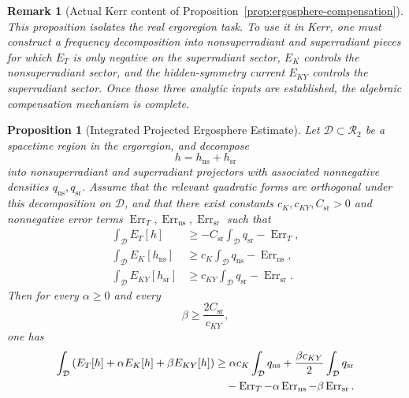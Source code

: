 \documentclass[12pt,a4paper]{article}
\newtheorem{proposition}[theorem]{Proposition}
\newtheorem{remark}[theorem]{Remark}
\begin{document}
\begin{remark}[Actual Kerr content of Proposition~\ref{prop:ergosphere-compensation}]
This proposition isolates the real ergoregion task. To use it in Kerr, one must construct a frequency decomposition into nonsuperradiant and superradiant pieces for which $E_T$ is only negative on the superradiant sector, $E_K$ controls the nonsuperradiant sector, and the hidden-symmetry current $E_{KY}$ controls the superradiant sector. Once those three analytic inputs are established, the algebraic compensation mechanism is complete.
\end{remark}

\begin{proposition}[Integrated Projected Ergosphere Estimate]\label{prop:integrated-ergosphere}
Let $\mathcal{D}\subset \mathcal{R}_2$ be a spacetime region in the ergoregion, and decompose
\begin{equation}
h = h_{\mathrm{ns}} + h_{\mathrm{sr}}
\end{equation}
into nonsuperradiant and superradiant projectors with associated nonnegative densities $q_{\mathrm{ns}}, q_{\mathrm{sr}}$. Assume that the relevant quadratic forms are orthogonal under this decomposition on $\mathcal{D}$, and that there exist constants $c_K,c_{KY},C_{\mathrm{sr}}>0$ and nonnegative error terms $\operatorname{Err}_T,\operatorname{Err}_{\mathrm{ns}},\operatorname{Err}_{\mathrm{sr}}$ such that
\begin{align}
\int_{\mathcal{D}} E_T[h] &\ge - C_{\mathrm{sr}} \int_{\mathcal{D}} q_{\mathrm{sr}} - \operatorname{Err}_T, \label{eq:int-erg-1}\\
\int_{\mathcal{D}} E_K[h_{\mathrm{ns}}] &\ge c_K \int_{\mathcal{D}} q_{\mathrm{ns}} - \operatorname{Err}_{\mathrm{ns}}, \label{eq:int-erg-2}\\
\int_{\mathcal{D}} E_{KY}[h_{\mathrm{sr}}] &\ge c_{KY} \int_{\mathcal{D}} q_{\mathrm{sr}} - \operatorname{Err}_{\mathrm{sr}}. \label{eq:int-erg-3}
\end{align}
Then for every $\alpha \ge 0$ and every
\begin{equation}
\beta \ge \frac{2C_{\mathrm{sr}}}{c_{KY}},
\end{equation}
one has
\begin{align}
\int_{\mathcal{D}} \left(E_T[h] + \alpha E_K[h] + \beta E_{KY}[h]\right)
&\ge \alpha c_K \int_{\mathcal{D}} q_{\mathrm{ns}}
 + \frac{\beta c_{KY}}{2} \int_{\mathcal{D}} q_{\mathrm{sr}} \notag\\
&\quad - \operatorname{Err}_T - \alpha \operatorname{Err}_{\mathrm{ns}} - \beta \operatorname{Err}_{\mathrm{sr}}. \label{eq:int-erg-final}
\end{align}
\end{proposition}
\end{document}
